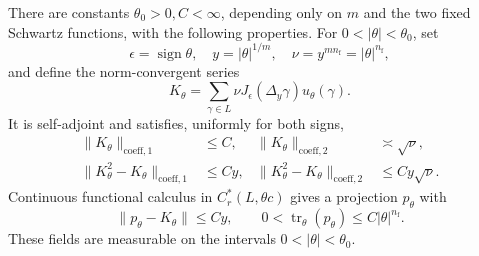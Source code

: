 \begin{proposition}\label{nil:projection}
There are constants \(\theta_0>0,C<\infty\), depending only on
\(m\) and the two fixed Schwartz functions, with the following
properties. For \(0<|\theta|<\theta_0\), set
\[
 \epsilon=\operatorname{sign}\theta,\quad
 y=|\theta|^{1/m},\quad
 \nu=y^{mn_{\mathrm f}}=|\theta|^{n_{\mathrm f}},
\]
and define the norm-convergent series
\begin{equation}\label{nil:K}
 K_\theta=\sum_{\gamma\in L}
          \nu J_\epsilon(\Delta_y\gamma)u_\theta(\gamma).
\end{equation}
It is self-adjoint and satisfies, uniformly for both signs,
\begin{align}
 \|K_\theta\|_{\mathrm{coeff},1}&\le C,&
 \|K_\theta\|_{\mathrm{coeff},2}&\asymp\sqrt{\nu},
                                               \label{nil:Knorms}\\
 \|K_\theta^2-K_\theta\|_{\mathrm{coeff},1}&\le Cy,&
 \|K_\theta^2-K_\theta\|_{\mathrm{coeff},2}&\le Cy\sqrt{\nu}.
                                               \label{nil:defects}
\end{align}
Continuous functional calculus in \(C_r^*(L,\theta c)\) gives a
projection \(p_\theta\) with
\begin{equation}\label{nil:projection-bounds}
 \|p_\theta-K_\theta\|\le Cy,\qquad
 0<\operatorname{tr}_\theta(p_\theta)\le C|\theta|^{n_{\mathrm f}}.
\end{equation}
These fields are measurable on the intervals \(0<|\theta|<\theta_0\).
\end{proposition}

